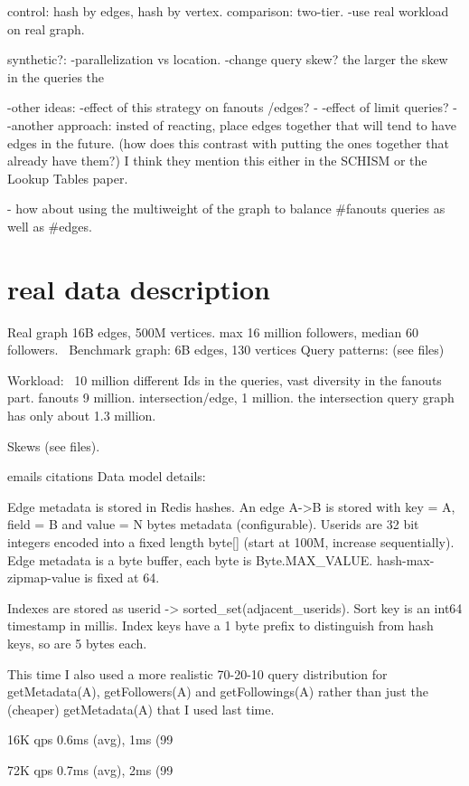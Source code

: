 \documentclass{article}
\begin{document}
control: hash by edges, hash by vertex. comparison: two-tier.
-use real workload on real graph.

synthetic?:
-parallelization vs location.
-change query skew? the larger the skew in the queries
the 


-other ideas:
-effect of this strategy on fanouts /edges? -
-effect of limit queries? -
-another approach: insted of reacting, place edges together that will tend to have edges in the future. (how does this contrast with putting the ones together that already have them?)
I think they mention this either in the SCHISM or the Lookup Tables paper.

- how about using the multiweight of the graph  to balance #fanouts queries as well as #edges.

\section{real data description}

Real graph 16B edges, 500M vertices.
max 16 million followers, median 60 followers.
\
Benchmark graph: 6B edges, 130 vertices
Query patterns:  (see files)

Workload:
~10 million different Ids in the queries, vast diversity in the fanouts part.
fanouts 9 million. intersection/edge, 1 million.
the intersection query graph has only about 1.3 million.

Skews (see files).

emails citations
Data model details:

Edge metadata is stored in Redis hashes. An edge A->B is stored with key = A, field = B and value = N bytes metadata (configurable). Userids are 32 bit integers encoded into a fixed length byte[] (start at 100M, increase sequentially). Edge metadata is a byte buffer, each byte is Byte.MAX_VALUE. hash-max-zipmap-value is fixed at 64.

Indexes are stored as userid -> sorted_set(adjacent_userids). Sort key is an int64 timestamp in millis. Index keys have a 1 byte prefix to distinguish from hash keys, so are 5 bytes each.

This time I also used a more realistic 70-20-10 query distribution for getMetadata(A), getFollowers(A) and getFollowings(A) rather than just the (cheaper) getMetadata(A) that I used last time.

16K qps
0.6ms (avg), 1ms (99%

72K qps
0.7ms (avg), 2ms (99%
\end{document}
